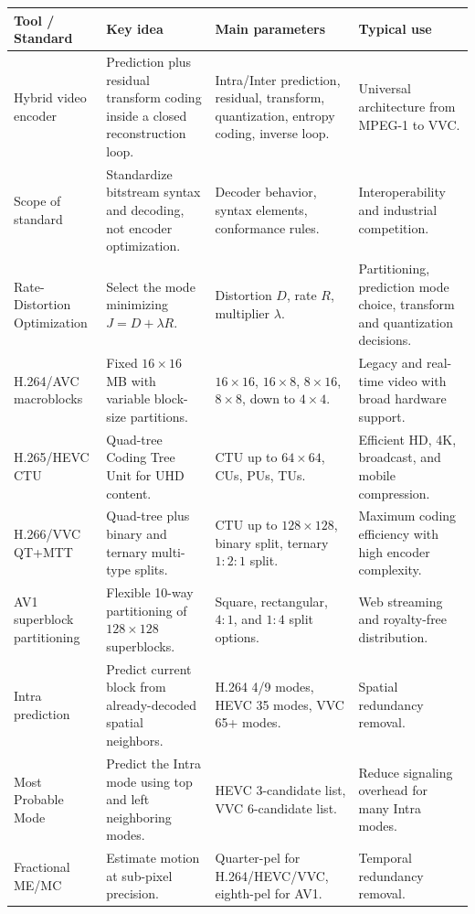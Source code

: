 \begin{center}
\begin{tabular}{|l|l|l|l|}
\hline
\textbf{Tool / Standard} & \textbf{Key idea} & \textbf{Main parameters} & \textbf{Typical use} \\ \hline
Hybrid video encoder & Prediction plus residual transform coding inside a closed reconstruction loop. & Intra/Inter prediction, residual, transform, quantization, entropy coding, inverse loop. & Universal architecture from MPEG-1 to VVC. \\ \hline
Scope of standard & Standardize bitstream syntax and decoding, not encoder optimization. & Decoder behavior, syntax elements, conformance rules. & Interoperability and industrial competition. \\ \hline
Rate-Distortion Optimization & Select the mode minimizing $J = D + \lambda R$. & Distortion $D$, rate $R$, multiplier $\lambda$. & Partitioning, prediction mode choice, transform and quantization decisions. \\ \hline
H.264/AVC macroblocks & Fixed $16 \times 16$ MB with variable block-size partitions. & $16 \times 16$, $16 \times 8$, $8 \times 16$, $8 \times 8$, down to $4 \times 4$. & Legacy and real-time video with broad hardware support. \\ \hline
H.265/HEVC CTU & Quad-tree Coding Tree Unit for UHD content. & CTU up to $64 \times 64$, CUs, PUs, TUs. & Efficient HD, 4K, broadcast, and mobile compression. \\ \hline
H.266/VVC QT+MTT & Quad-tree plus binary and ternary multi-type splits. & CTU up to $128 \times 128$, binary split, ternary $1:2:1$ split. & Maximum coding efficiency with high encoder complexity. \\ \hline
AV1 superblock partitioning & Flexible 10-way partitioning of $128 \times 128$ superblocks. & Square, rectangular, $4:1$, and $1:4$ split options. & Web streaming and royalty-free distribution. \\ \hline
Intra prediction & Predict current block from already-decoded spatial neighbors. & H.264 4/9 modes, HEVC 35 modes, VVC 65+ modes. & Spatial redundancy removal. \\ \hline
Most Probable Mode & Predict the Intra mode using top and left neighboring modes. & HEVC 3-candidate list, VVC 6-candidate list. & Reduce signaling overhead for many Intra modes. \\ \hline
Fractional ME/MC & Estimate motion at sub-pixel precision. & Quarter-pel for H.264/HEVC/VVC, eighth-pel for AV1. & Temporal redundancy removal. \\ \hline

\end{tabular}
\end{center}
